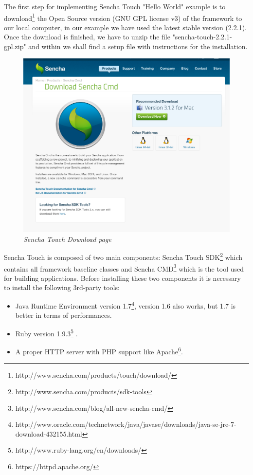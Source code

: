 \documentclass[a4paper,12pt]{book}
\begin{document}
The first step for implementing Sencha Touch "Hello World" example is to download\footnote{http://www.sencha.com/products/touch/download/} the Open Source version (GNU GPL license v3) of the framework to our local computer, in our example we have used the latest stable version (2.2.1). Once the download is finished, we have to unzip the file "sencha-touch-2.2.1-gpl.zip" and within we shall find a setup file with instructions for the installation.

\begin{figure}[H]
    \centering
    \includegraphics[width=12cm, keepaspectratio]{img/sencha1.png}
    \caption{\textit{Sencha Touch Download page}}
 \end{figure}

Sencha Touch is composed of two main components: Sencha Touch SDK\footnote{http://www.sencha.com/products/sdk-tools} which contains all framework baseline classes and Sencha CMD\footnote{http://www.sencha.com/blog/all-new-sencha-cmd/} which is the tool used for building applications. Before installing these two components it is necessary to install the following 3rd-party tools:

\begin{itemize}
 \item Java Runtime Environment version 1.7\footnote{http://www.oracle.com/technetwork/java/javase/downloads/java-se-jre-7-download-432155.html}, version 1.6 also works, but 1.7 is better in terms of performances.
 \item Ruby version 1.9.3\footnote{http://www.ruby-lang.org/en/downloads/} .
 \item A proper HTTP server with PHP support like Apache\footnote{https://httpd.apache.org/}.
\end{itemize}
\end{document}
